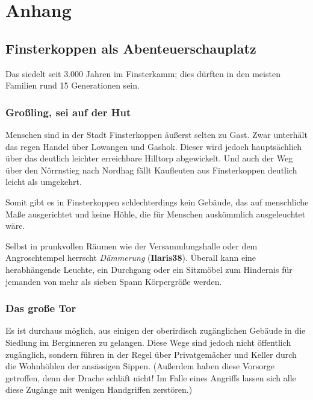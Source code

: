 \spaltenende
\section{Anhang}
\spaltenanfang




\subsection{Finsterkoppen als Abenteuer\-schauplatz}

Das \fkv siedelt seit 3.000 Jahren im Finsterkamm; dies dürften in den meisten Familien rund 15 Generationen sein.

\subsubsection{Großling, sei auf der Hut}
Menschen sind in der Stadt Finsterkoppen äußerst selten zu Gast. Zwar unterhält das \fkv regen Handel über Lowangen und Gashok.
Dieser wird jedoch hauptsächlich über das deutlich leichter erreichbare Hilltorp abgewickelt.
Und auch der Weg über den N\^orrnstieg nach Nordhag fällt Kaufleuten aus Finsterkoppen deutlich leicht als umgekehrt.

Somit gibt es in Finsterkoppen schlechterdings kein Gebäude, das auf menschliche Maße ausgerichtet und keine Höhle, die für Menschen auskömmlich ausgeleuchtet wäre.

Selbst in prunkvollen Räumen wie der Versammlungshalle oder dem Angroschtempel herrscht \emph{Dämmerung} (\textbf{Ilaris38}).
Überall kann eine herabhängende Leuchte, ein Durchgang oder ein Sitzmöbel zum Hindernis für jemanden von mehr als sieben Spann Körpergröße werden.

\subsubsection{Das große Tor}
Es ist durchaus möglich, aus einigen der oberirdisch zugänglichen Gebäude in die Siedlung im Berginneren zu gelangen.
Diese Wege sind jedoch nicht öffentlich zugänglich, sondern führen in der Regel über Privatgemächer und Keller durch die Wohnhöhlen der ansässigen Sippen. 
(Außerdem haben diese Vorsorge getroffen, denn der Drache schläft nicht! Im Falle eines Angriffs lassen sich alle diese Zugänge mit wenigen Handgriffen zerstören.)

